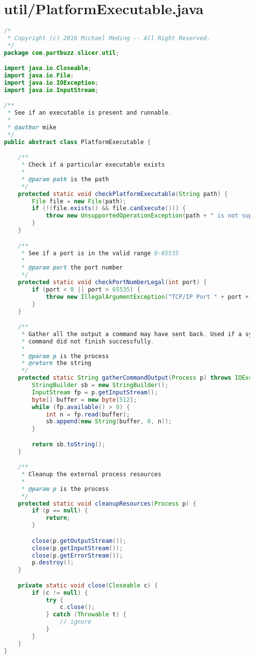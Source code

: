 \section{util/PlatformExecutable.java}
\begin{lstlisting}[language=Java, label={lst:PlatformExecutable}, caption=The PlatformExecutable class verifies if the local C++ executable is available and sets up the input and output pipes for CuraEngine if it is.]
/*
 * Copyright (c) 2016 Michael Meding -- All Right Reserved.
 */
package com.partbuzz.slicer.util;

import java.io.Closeable;
import java.io.File;
import java.io.IOException;
import java.io.InputStream;

/**
 * See if an executable is present and runnable.
 *
 * @author mike
 */
public abstract class PlatformExecutable {

	/**
	 * Check if a particular executable exists
	 *
	 * @param path is the path
	 */
	protected static void checkPlatformExecutable(String path) {
		File file = new File(path);
		if (!(file.exists() && file.canExecute())) {
			throw new UnsupportedOperationException(path + " is not supported on this platform");
		}
	}

	/**
	 * See if a port is in the valid range 0-65535
	 *
	 * @param port the port number
	 */
	protected static void checkPortNumberLegal(int port) {
		if (port < 0 || port > 65535) {
			throw new IllegalArgumentException("TCP/IP Port " + port + " illegal");
		}
	}

	/**
	 * Gather all the output a command may have sent back. Used if a system
	 * command did not finish successfully.
	 *
	 * @param p is the process
	 * @return the string
	 */
	protected static String gatherCommandOutput(Process p) throws IOException {
		StringBuilder sb = new StringBuilder();
		InputStream fp = p.getInputStream();
		byte[] buffer = new byte[512];
		while (fp.available() > 0) {
			int n = fp.read(buffer);
			sb.append(new String(buffer, 0, n));
		}

		return sb.toString();
	}

	/**
	 * Cleanup the external process resources
	 *
	 * @param p is the process
	 */
	protected static void cleanupResources(Process p) {
		if (p == null) {
			return;
		}

		close(p.getOutputStream());
		close(p.getInputStream());
		close(p.getErrorStream());
		p.destroy();
	}

	private static void close(Closeable c) {
		if (c != null) {
			try {
				c.close();
			} catch (Throwable t) {
				// ignore
			}
		}
	}
}
\end{lstlisting}